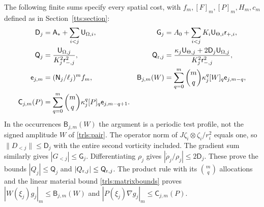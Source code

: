 The following finite sums specify every spatial cost, with
$f_m,[F]_m,[P]_m,H_m,c_m$ defined as in Section~\ref{tts:section}:
\begin{align}\label{trls:costdefinitions}
 \mathsf D_j&=\mathsf A_*+\sum_{i<j}\mathsf U_{\Omega,i},&
 \mathsf G_j&=A_0+\sum_{i<j}K_i\mathsf U_{\Theta,i}
                                      \mathsf r_{+,i},\nonumber\\
 \mathsf Q_j&=\frac{\mathsf U_{\Omega,j}}
                         {K_j^2\mathsf r_{-,j}^2},&
 \mathsf Q_{{\rm r},j}&=
 \frac{\mathsf\kappa_j\mathsf U_{\Theta,j}
                   +2\mathsf D_j\mathsf U_{\Omega,j}}
      {K_j^2\mathsf r_{-,j}^2},\\
 \mathsf e_{j,m}&=(\mathsf N_j/\ell_j)^mf_m,&
 \mathsf B_{j,m}(W)&=\sum_{q=0}^m\binom mq
          \mathsf\kappa_j^q[W]_q\mathsf e_{j,m-q},\nonumber\\
 \mathsf C_{j,m}(P)&=\sum_{q=0}^m\binom mq
          \mathsf\kappa_j^q[P]_q\mathsf e_{j,m-q+1}.&&\nonumber
\end{align}
In the occurrences $\mathsf B_{j,m}(W)$ the argument is a
periodic test profile, not the signed amplitude $W$ of
\eqref{trls:pair}. The operator norm of
$J\zeta_i\otimes\zeta_i/r_i^2$ equals one, so
$\|D_{<j}\|\leq\mathsf D_j$ with the entire second
vorticity included. The gradient sum similarly gives
$|G_{<j}|\leq\mathsf G_j$. Differentiating
$\rho_j$ gives $|\dot\rho_j/\rho_j|\leq2\mathsf D_j$.
These prove the bounds $|Q_j|\leq\mathsf Q_j$ and
$|Q_{{\rm r},j}|\leq\mathsf Q_{{\rm r},j}$.
The product rule with its $\binom mq$ allocations and the
linear material bound \eqref{trls:matrixbounds} proves
$|W(\xi_j)g_j|_m\leq\mathsf B_{j,m}(W)$ and
$|P(\xi_j)\nabla g_j|_m\leq\mathsf C_{j,m}(P)$.

